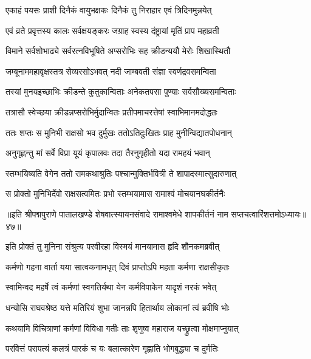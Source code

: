 \twolineshloka
{एकाहं पयसः प्राशी दिनैकं वायुभक्षकः}
{दिनैकं तु निराहार एवं त्रिदिनमुन्नयेत्}%

\twolineshloka
{एवं व्रते प्रवृत्तस्य कालः सर्वक्षयङ्करः}
{जग्राह स्वस्य दंष्ट्रायां मृतिं प्राप महाव्रती}%

\twolineshloka
{विमाने सर्वशोभाढ्ये सर्वरत्नविभूषिते}
{अप्सरोभिः सह क्रीडन्ययौ मेरोः शिखास्थितौ}%

\twolineshloka
{जम्बूनाममहावृक्षस्तत्र सेव्यरसोऽभवत्}
{नदी जाम्बवती संज्ञा स्वर्णद्रवसमन्विता}%

\twolineshloka
{तस्यां मुनयइच्छाभिः क्रीडन्ते कुतुकान्विताः}
{अनेकतपसा पुण्याः सर्वसौख्यसमन्विताः}%

\twolineshloka
{तत्रासौ स्वेच्छया क्रीडन्नप्सरोभिर्मुदान्वितः}
{प्रतीपमाचरत्तेषां स्वाभिमानमदोद्धतः}%

\twolineshloka
{ततः शप्तः स मुनिभी राक्षसो भव दुर्मुखः}
{ततोऽतिदुःखितः प्राह मुनीन्विद्यातपोधनान्}%

\twolineshloka
{अनुगृह्णन्तु मां सर्वे विप्रा यूयं कृपालवः}
{तदा तैरनुगृहीतो यदा रामहयं भवान्}%

\twolineshloka
{स्तम्भयिष्यति वेगेन ततो रामकथाश्रुतिः}
{पश्चान्मुक्तिर्भवित्री ते शापादस्मात्सुदारुणात्}%

\twolineshloka
{स प्रोक्तो मुनिभिर्देवो राक्षसत्वमितः प्रभो}
{स्तम्भयामास रामाश्वं मोचयानघकीर्तनैः}%

{॥इति श्रीपद्मपुराणे पातालखण्डे शेषवात्स्यायनसंवादे रामाश्वमेधे शापकीर्तनं नाम सप्तचत्वारिंशत्तमोऽध्यायः॥४७॥}

\resetShloka


\twolineshloka
{इति प्रोक्तं तु मुनिना संश्रुत्य परवीरहा}
{विस्मयं मानयामास हृदि शौनकमब्रवीत्}%


\twolineshloka
{कर्मणो गहना वार्ता यया सात्वकनामधृत्}
{दिवं प्राप्तोऽपि महता कर्मणा राक्षसीकृतः}%

\twolineshloka
{स्वामिन्वद महर्षे त्वं कर्मणां स्वगतिर्यथा}
{येन कर्मविपाकेन यादृशं नरकं भवेत्}%


\twolineshloka
{धन्योसि राघवश्रेष्ठ यत्ते मतिरियं शुभा}
{जानन्नपि हितार्थाय लोकानां त्वं ब्रवीषि भोः}%

\twolineshloka
{कथयामि विचित्राणां कर्मणां विविधा गतीः}
{ताः शृणुष्व महाराज यच्छ्रुत्वा मोक्षमाप्नुयात्}%

\twolineshloka
{परवित्तं परापत्यं कलत्रं पारकं च यः}
{बलात्कारेण गृह्णाति भोगबुद्ध्या च दुर्मतिः}%

